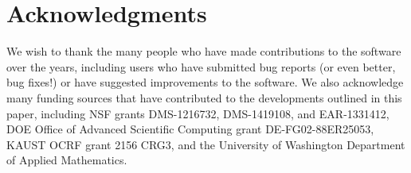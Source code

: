 %
%


\section*{Acknowledgments} 

We wish to thank the many people who have made contributions to the 
\clawpack software over the years, including users who have submitted bug
reports (or even better, bug fixes!) or have suggested
improvements to the software.  We also acknowledge many funding sources that
have contributed to the developments outlined in this paper, including
NSF grants DMS-1216732, DMS-1419108, and EAR-1331412,
DOE Office of Advanced Scientific Computing grant DE-FG02-88ER25053,
KAUST OCRF grant 2156 CRG3, and
the University of Washington Department of Applied Mathematics.



